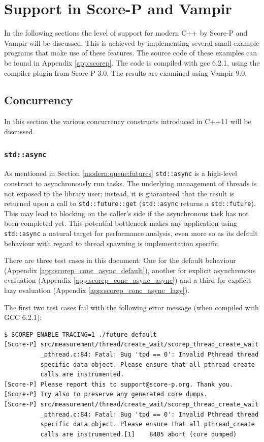 \section{Support in Score-P and Vampir}

In the following sections the level of support for modern C++ by Score-P and Vampir will be discussed. This is achieved by implementing several small example programs that make use of these features. The source code of these examples can be found in Appendix \ref{app:scorep}. The code is compiled with gcc 6.2.1, using the compiler plugin from Score-P 3.0. The results are examined using Vampir 9.0.

\subsection{Concurrency}\label{scorep:conc}

In this section the various concurrency constructs introduced in C++11 will be discussed.

\subsubsection{\texttt{std::async}}\label{scorep:conc:async}

As mentioned in Section \ref{modern:queue:futures} \texttt{std::async} is a high-level construct to asynchronously run tasks. The underlying management of threads is not exposed to the library user; instead, it is guaranteed that the result is returned upon a call to \texttt{std::future::get} (\texttt{std::async} returns a \texttt{std::future}). This may lead to blocking on the caller's side if the asynchronous task has not been completed yet. This potential bottleneck makes any application using \texttt{std::async} a natural target for performance analysis, even more so as its default behaviour with regard to thread spawning is implementation specific.

There are three test cases in this document: One for the default behaviour (Appendix \ref{app:scorep_conc_async_default}), another for explicit asynchronous evaluation (Appendix \ref{app:scorep_conc_async_async}) and a third for explicit lazy evaluation (Appendix \ref{app:scorep_conc_async_lazy}).

The first two test cases fail with the following error message (when compiled with GCC 6.2.1):

\begin{verbatim}
$ SCOREP_ENABLE_TRACING=1 ./future_default                                      
[Score-P] src/measurement/thread/create_wait/scorep_thread_create_wait
          _pthread.c:84: Fatal: Bug 'tpd == 0': Invalid Pthread thread
          specific data object. Please ensure that all pthread_create
          calls are instrumented.
[Score-P] Please report this to support@score-p.org. Thank you.
[Score-P] Try also to preserve any generated core dumps.
[Score-P] src/measurement/thread/create_wait/scorep_thread_create_wait
          _pthread.c:84: Fatal: Bug 'tpd == 0': Invalid Pthread thread
          specific data object. Please ensure that all pthread_create
          calls are instrumented.[1]    8405 abort (core dumped)
\end{verbatim}

